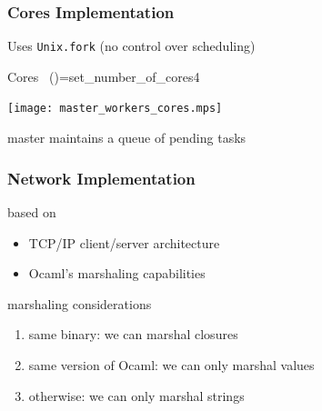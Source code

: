 \documentclass[xcolor=dvipsnames]{beamer}
\let\emph\alert
\begin{document}
\begin{frame}\frametitle {Cores Implementation}
  Uses \texttt{Unix.fork} (no control over scheduling)

  

\medskip\noindent
{\colorbox{tmpcolor}{\begin{minipage}{\textwidth}\ttfamily\parindent 0pt

\noindent{}\hspace*{1.22ex}Cores~\linebreak
\noindent{}\hspace*{1.22ex}()\hspace*{1.22ex}=\hspace*{1.22ex}set\_{}number\_{}of\_{}cores\hspace*{1.22ex}4
\end{minipage}}}


\medskip\noindent

  \begin{center}
    \texttt{[image: master\_workers\_cores.mps]}
  \end{center}

  master maintains a queue of pending tasks
  
\end{frame}



\begin{frame}\frametitle {Network Implementation}
  based on
  \begin{itemize}
  \item TCP/IP client/server architecture
  \item Ocaml's marshaling capabilities
  \end{itemize}
  
  \vfill
  marshaling considerations
  \begin{enumerate}
  \item \emph{same binary}: we can marshal closures
  \item \emph{same version of Ocaml}: we can only marshal values
  \item \emph{otherwise}: we can only marshal strings
  \end{enumerate}
  
\end{frame}
\end{document}

